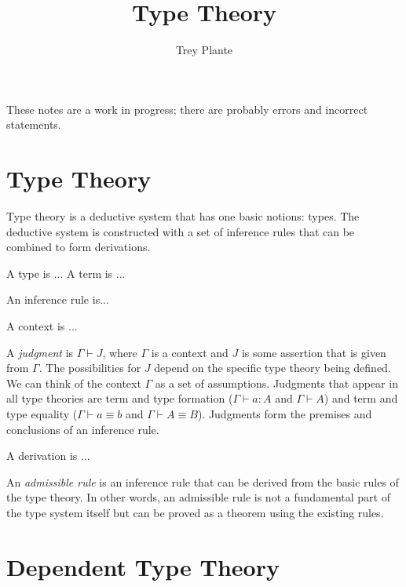 \documentclass{article}
\title{Type Theory}
\author{Trey Plante}
\begin{document}
\maketitle
These notes are a work in progress; there are probably errors and incorrect statements.

\section{Type Theory}

Type theory is a deductive system that has one basic notions: types. The deductive system is constructed with a set of inference rules that can be combined to form derivations.

\begin{definition}
  A type is ... A term is ...
\end{definition}

\begin{definition}
  An inference rule is...
\end{definition}

\begin{definition}
  A context is ...
\end{definition}

\begin{definition}\label{dfn: judgment}
  A \emph{judgment} is $\Gamma \vdash J$, where $\Gamma$ is a context and $J$ is some assertion that is given from $\Gamma$. The possibilities for $J$ depend on the specific type theory being defined. We can think of the context $\Gamma$ as a set of assumptions. Judgments that appear in all type theories are term and type formation ($\Gamma \vdash a : A$ and $\Gamma \vdash A$) and term and type equality ($\Gamma \vdash a \equiv b$ and $\Gamma \vdash A \equiv B$). Judgments form the premises and conclusions of an inference rule.
\end{definition}

\begin{definition}
  A derivation is ...
\end{definition}

\begin{definition}
  An \emph{admissible rule} is an inference rule that can be derived from the basic rules of the type theory. In other words, an admissible rule is not a fundamental part of the type system itself but can be proved as a theorem using the existing rules.
\end{definition}

\section{Dependent Type Theory}
\end{document}
